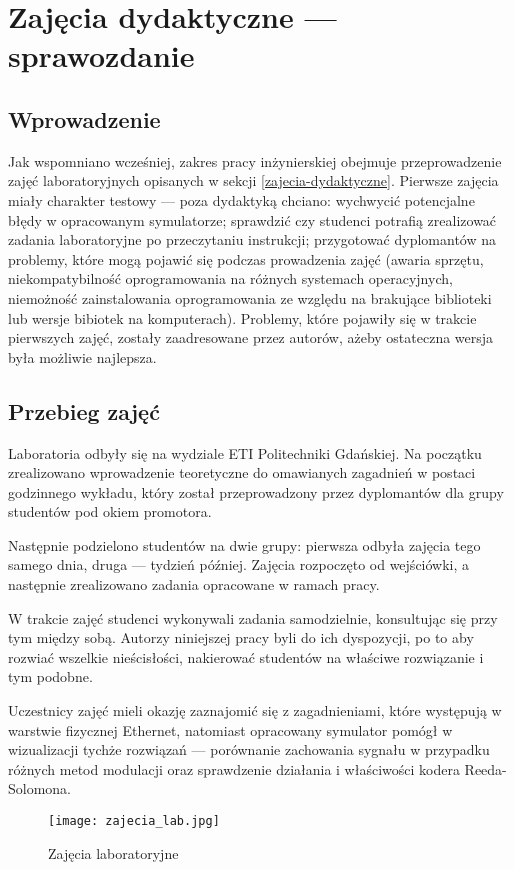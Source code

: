 \section{Zajęcia dydaktyczne --- sprawozdanie}
\subsection{Wprowadzenie}

Jak wspomniano wcześniej, zakres pracy inżynierskiej obejmuje przeprowadzenie zajęć laboratoryjnych opisanych w sekcji \ref{zajecia-dydaktyczne}.
Pierwsze zajęcia miały charakter testowy --- poza dydaktyką chciano: wychwycić potencjalne błędy w opracowanym symulatorze; sprawdzić czy studenci
potrafią zrealizować zadania laboratoryjne po przeczytaniu instrukcji; przygotować dyplomantów na problemy, które mogą pojawić się podczas prowadzenia
zajęć (awaria sprzętu, niekompatybilność oprogramowania na różnych systemach operacyjnych, niemożność zainstalowania oprogramowania ze względu na brakujące
biblioteki lub wersje bibiotek na komputerach). Problemy, które pojawiły się w trakcie pierwszych zajęć, zostały zaadresowane przez autorów, ażeby
ostateczna wersja była możliwie najlepsza.

\subsection{Przebieg zajęć}

Laboratoria odbyły się na wydziale ETI Politechniki Gdańskiej. Na początku zrealizowano wprowadzenie teoretyczne do omawianych zagadnień w postaci godzinnego
wykładu, który został przeprowadzony przez dyplomantów dla grupy studentów pod okiem promotora.

Następnie podzielono studentów na dwie grupy: pierwsza odbyła zajęcia tego samego dnia, druga --- tydzień później.
Zajęcia rozpoczęto od wejściówki, a następnie zrealizowano zadania opracowane w ramach pracy.

W trakcie zajęć studenci wykonywali zadania samodzielnie, konsultując się przy tym między sobą. Autorzy niniejszej pracy
byli do ich dyspozycji, po to aby rozwiać wszelkie nieścisłości, nakierować studentów na właściwe rozwiązanie i tym podobne.

Uczestnicy zajęć mieli okazję zaznajomić się z zagadnieniami, które występują w warstwie fizycznej Ethernet, natomiast
opracowany symulator pomógł w wizualizacji tychże rozwiązań --- porównanie zachowania sygnału w przypadku różnych metod modulacji oraz
sprawdzenie działania i właściwości kodera Reeda-Solomona.


\begin{figure}[ht]
    \centering
    \texttt{[image: zajecia\_lab.jpg]}
    \caption{Zajęcia laboratoryjne}
    \label{fig:zajecia_lab_zdjecie}
\end{figure}
